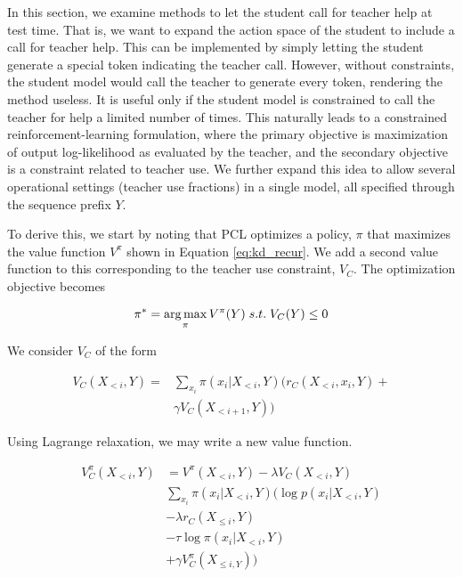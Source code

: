 In this section, we examine methods to let the student call for teacher help at test time. That is, we want to expand the action space of the student to include a call for teacher help. This can be implemented by simply letting the student generate a special token indicating the teacher call. However, without constraints, the student model would call the teacher to generate every token, rendering the method useless. It is useful only if the student model is constrained to call the teacher for help a limited number of times. This naturally leads to a constrained reinforcement-learning formulation, where the primary objective is maximization of output log-likelihood as evaluated by the teacher, and the secondary objective is a constraint related to teacher use. We further expand this idea to allow several operational settings (teacher use fractions) in a single model, all specified through the sequence prefix $Y$.

To derive this, we start by noting that PCL optimizes a policy, $\pi$ that maximizes the value function $V^{\pi}$ shown in Equation \ref{eq:kd_recur}. We add a second value function to this corresponding to the teacher use constraint, $V_C$. The optimization objective becomes

\begin{equation}
    \pi^* = \operatorname*{arg\,max}_{\pi} V^{\pi}(Y)\;s.t.\;V_C(Y) \leq 0 \label{eq:optim}
\end{equation}

We consider $V_C$ of the form

\begin{align}
V_C(X_{<i}, Y) = &\sum_{x_i} \pi(x_i|X_{<i}, Y)(r_C(X_{<i},x_i,Y) + \nonumber \\
&\gamma V_C(X_{<i+1}, Y))
\end{align}

Using Lagrange relaxation, we may write a new value function.

\begin{align}
    V_C^{\pi}(X_{<i}, Y) &= V^{\pi}(X_{<i}, Y) - \lambda V_C(X_{<i}, Y) \nonumber \\
    &\sum_{x_i} \pi(x_i|X_{<i}, Y)\Big(\log p(x_i|X_{<i},Y) \nonumber \\
    &- \lambda r_C(X_{\leq i}, Y) \nonumber \\
    &- \tau \log \pi(x_i|X_{<i},Y) \nonumber \\
    &+ \gamma V_C^{\pi}(X_{\leq i, Y})\Big) \label{eq:constrained_pcl}
\end{align}

